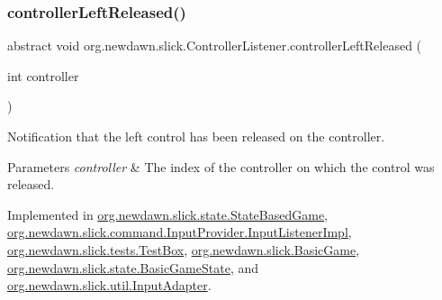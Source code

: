 \mbox{\label{interfaceorg_1_1newdawn_1_1slick_1_1_controller_listener_ad2f898f0efe21771a0d9568c454dea0d}} 
\subsubsection{\texorpdfstring{controller\+Left\+Released()}{controllerLeftReleased()}}
{\footnotesize\ttfamily abstract void org.\+newdawn.\+slick.\+Controller\+Listener.\+controller\+Left\+Released (\begin{DoxyParamCaption}\item[{int}]{controller }\end{DoxyParamCaption})\hspace{0.3cm}{\ttfamily [abstract]}}

Notification that the left control has been released on the controller.


\begin{DoxyParams}{Parameters}
{\em controller} & The index of the controller on which the control was released. \\
\hline
\end{DoxyParams}


Implemented in \mbox{\hyperlink{classorg_1_1newdawn_1_1slick_1_1state_1_1_state_based_game_ae3b66d6b132b6622fa13c125f806e30b}{org.\+newdawn.\+slick.\+state.\+State\+Based\+Game}}, \mbox{\hyperlink{classorg_1_1newdawn_1_1slick_1_1command_1_1_input_provider_1_1_input_listener_impl_ae67daea3a1e5b57c6189099410b17521}{org.\+newdawn.\+slick.\+command.\+Input\+Provider.\+Input\+Listener\+Impl}}, \mbox{\hyperlink{classorg_1_1newdawn_1_1slick_1_1tests_1_1_test_box_a52d79ff8a6f778651fff642b6d91b2de}{org.\+newdawn.\+slick.\+tests.\+Test\+Box}}, \mbox{\hyperlink{classorg_1_1newdawn_1_1slick_1_1_basic_game_a0fd5869789b811258bc2d8d562c36243}{org.\+newdawn.\+slick.\+Basic\+Game}}, \mbox{\hyperlink{classorg_1_1newdawn_1_1slick_1_1state_1_1_basic_game_state_a71bbea4a21962a1a403e51f0ccd9a87c}{org.\+newdawn.\+slick.\+state.\+Basic\+Game\+State}}, and \mbox{\hyperlink{classorg_1_1newdawn_1_1slick_1_1util_1_1_input_adapter_af1419aca62539a39f52be90f64e778e3}{org.\+newdawn.\+slick.\+util.\+Input\+Adapter}}.

